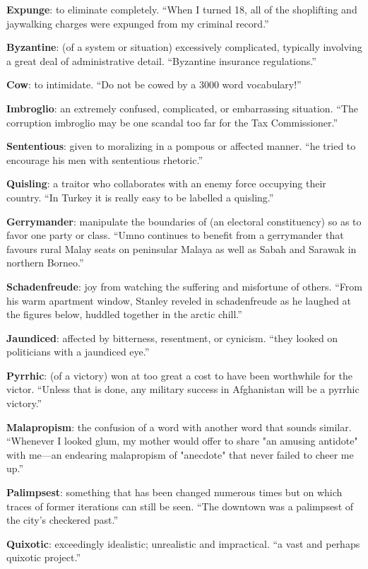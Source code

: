 \documentclass[12pt, a4paper]{ximera}
\begin{document}
\textbf{Expunge}: to eliminate completely. ``When I turned 18, all of the shoplifting and jaywalking charges were expunged from my criminal record.''

\textbf{Byzantine}: (of a system or situation) excessively complicated, typically involving a great deal of administrative detail. ``Byzantine insurance regulations.''

\textbf{Cow}: to intimidate. ``Do not be cowed by a 3000 word vocabulary!''

\textbf{Imbroglio}: an extremely confused, complicated, or embarrassing situation. ``The corruption imbroglio may be one scandal too far for the Tax Commissioner.''

\textbf{Sententious}: given to moralizing in a pompous or affected manner. ``he tried to encourage his men with sententious rhetoric.''

\textbf{Quisling}: a traitor who collaborates with an enemy force occupying their country. ``In Turkey it is really easy to be labelled a quisling.''

\textbf{Gerrymander}: manipulate the boundaries of (an electoral constituency) so as to favor one party or class. ``Umno continues to benefit from a gerrymander that favours rural Malay seats on peninsular Malaya as well as Sabah and Sarawak in northern Borneo.''

\textbf{Schadenfreude}:  joy from watching the suffering and misfortune of others. ``From his warm apartment window, Stanley reveled in schadenfreude as he laughed at the figures below, huddled together in the arctic chill.''

\textbf{Jaundiced}: affected by bitterness, resentment, or cynicism. ``they looked on politicians with a jaundiced eye.''

\textbf{Pyrrhic}: (of a victory) won at too great a cost to have been worthwhile for the victor. ``Unless that is done, any military success in Afghanistan will be a pyrrhic victory.''

\textbf{Malapropism}: the confusion of a word with another word that sounds similar. ``Whenever I looked glum, my mother would offer to share "an amusing antidote" with me—an endearing malapropism of "anecdote" that never failed to cheer me up.''

\textbf{Palimpsest}: something that has been changed numerous times but on which traces of former iterations can still be seen. ``The downtown was a palimpsest of the city’s checkered past.''

\textbf{Quixotic}: exceedingly idealistic; unrealistic and impractical. ``a vast and perhaps quixotic project.''
\end{document}

